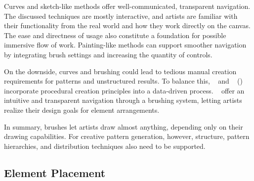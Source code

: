 Curves and sketch-like methods offer well-communicated, transparent navigation. The discussed techniques are mostly interactive, and artists are familiar with their functionality from the real world and how they work directly on the canvas. The ease and directness of usage also constitute a foundation for possible immersive flow of work. Painting-like methods can support smoother navigation by integrating brush settings and increasing the quantity of controls. 

On the downside, curves and brushing could lead to tedious manual creation requirements for patterns and unstructured results. To balance this, \citeauthor*{kazi_2012_vit}~\cite{kazi_2012_vit} and \citeauthor*{xing_2014_apr}~\cite{xing_2014_apr} () incorporate procedural creation principles into a data-driven process. \citeauthor*{hsu_2020_aef}~\cite{hsu_2020_aef} offer an intuitive and transparent navigation through a brushing system, letting artists realize their design goals for element arrangements. 



In summary, brushes let artists draw almost anything, depending only on their drawing capabilities. For creative pattern generation, however, structure, pattern hierarchies, and distribution techniques also need to be supported. 



\subsection{Element Placement}
\label{subsubsec:analysis_creative_means_elements}

